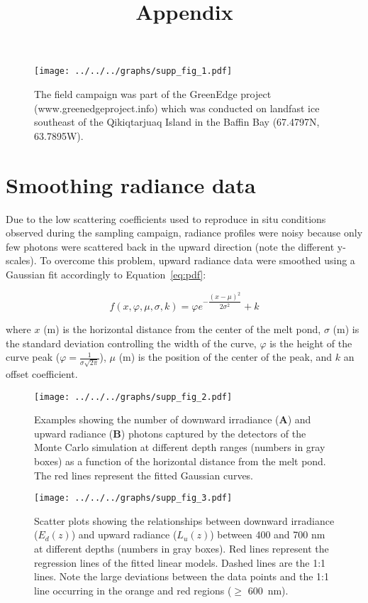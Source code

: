 \documentclass[10pt]{article}
\title{Appendix}
\date{}
\newcommand{\edz}{\ensuremath{{E_d(z)}}}
\newcommand{\luz}{\ensuremath{{L_u(z)}}}
\begin{document}
\maketitle

\begin{figure}[h]
	\centering
	\texttt{[image: ../../../graphs/supp\_fig\_1.pdf]}
	\caption{The field campaign was part of the GreenEdge project (www.greenedgeproject.info) which was conducted on landfast ice southeast of the Qikiqtarjuaq Island in the Baffin Bay (67.4797N, 63.7895W).}
\end{figure}

\clearpage
\newpage

\section{Smoothing radiance data}

Due to the low scattering coefficients used to reproduce in situ conditions observed during the sampling campaign, radiance profiles were noisy because only few photons were scattered back in the upward direction (note the different y-scales). To overcome this problem, upward radiance data were smoothed using a Gaussian fit accordingly to Equation~\ref{eq:pdf}:

\begin{equation}
	\label{eq:pdf}
	f(x,\varphi,\mu,\sigma, k) = \varphi e^{-\dfrac{(x-\mu)^2}{2 \sigma^2}} + k
\end{equation}

\noindent where $x$ (m) is the horizontal distance from the center of the melt pond, $\sigma$ (m) is the standard deviation controlling the width of the curve, $\varphi$ is the height of the curve peak ($\varphi = \frac{1}{\sigma\sqrt{2\pi}}$), $\mu$ (m) is the position of the center of the peak, and $k$ an offset coefficient.

\begin{figure}[h]
	\centering
	\texttt{[image: ../../../graphs/supp\_fig\_2.pdf]}
	\caption{Examples showing the number of downward irradiance (\textbf{A}) and upward radiance (\textbf{B}) photons captured by the detectors of the Monte Carlo simulation at different depth ranges (numbers in gray boxes) as a function of the horizontal distance from the melt pond. The red lines represent the fitted Gaussian curves.}
\end{figure}

\clearpage
\newpage

\begin{figure}[H]
	\centering
	\texttt{[image: ../../../graphs/supp\_fig\_3.pdf]}
	\caption{Scatter plots showing the relationships between downward irradiance (\edz{}) and upward radiance (\luz{}) between 400 and 700 nm at different depths (numbers in gray boxes). Red lines represent the regression lines of the fitted linear models. Dashed lines are the 1:1 lines. Note the large deviations between the data points and the 1:1 line occurring in the orange and red regions ($\ge$ 600~nm).}
\end{figure}
\end{document}
